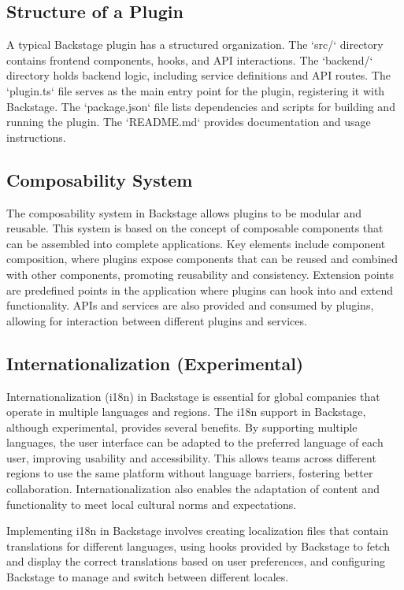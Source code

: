 \subsection{Structure of a Plugin}

A typical Backstage plugin has a structured organization. The `src/` directory contains frontend components, hooks, and API interactions. The `backend/` directory holds backend logic, including service definitions and API routes. The `plugin.ts` file serves as the main entry point for the plugin, registering it with Backstage. The `package.json` file lists dependencies and scripts for building and running the plugin. The `README.md` provides documentation and usage instructions.

\subsection{Composability System}

The composability system in Backstage allows plugins to be modular and reusable. This system is based on the concept of composable components that can be assembled into complete applications. Key elements include component composition, where plugins expose components that can be reused and combined with other components, promoting reusability and consistency. Extension points are predefined points in the application where plugins can hook into and extend functionality. APIs and services are also provided and consumed by plugins, allowing for interaction between different plugins and services.

\subsection{Internationalization (Experimental)}

Internationalization (i18n) in Backstage is essential for global companies that operate in multiple languages and regions. The i18n support in Backstage, although experimental, provides several benefits. By supporting multiple languages, the user interface can be adapted to the preferred language of each user, improving usability and accessibility. This allows teams across different regions to use the same platform without language barriers, fostering better collaboration. Internationalization also enables the adaptation of content and functionality to meet local cultural norms and expectations.

Implementing i18n in Backstage involves creating localization files that contain translations for different languages, using hooks provided by Backstage to fetch and display the correct translations based on user preferences, and configuring Backstage to manage and switch between different locales.

